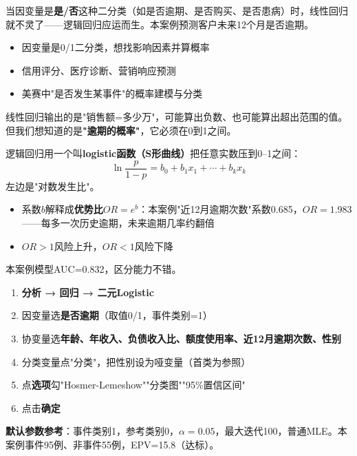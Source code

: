 
\begin{algointro}
当因变量是\textbf{是/否}这种二分类（如是否逾期、是否购买、是否患病）时，线性回归就不灵了——逻辑回归应运而生。本案例预测客户未来12个月是否逾期。
\end{algointro}

\begin{algoscene}
\begin{itemize}
    \item 因变量是0/1二分类，想找影响因素并算概率
    \item 信用评分、医疗诊断、营销响应预测
    \item 美赛中"是否发生某事件"的概率建模与分类
\end{itemize}
\end{algoscene}

\begin{algoprinciple}
线性回归输出的是"销售额=多少万"，可能算出负数、也可能算出超出范围的值。但我们想知道的是\textbf{"逾期的概率"}，它必须在0到1之间。

逻辑回归用一个叫\textbf{logistic函数（S形曲线）}把任意实数压到0--1之间：
$$\ln\frac{p}{1-p}=b_0+b_1x_1+\cdots+b_kx_k$$
左边是"对数发生比"。
\begin{itemize}
    \item 系数$b$解释成\textbf{优势比$OR=e^b$}：本案例"近12月逾期次数"系数0.685，$OR=1.983$——每多一次历史逾期，未来逾期几率约翻倍
    \item $OR>1$风险上升，$OR<1$风险下降
\end{itemize}

本案例模型AUC=0.832，区分能力不错。
\end{algoprinciple}

\begin{algosposs}
\begin{enumerate}
    \item \textbf{分析 → 回归 → 二元Logistic}
    \item 因变量选\textbf{是否逾期}（取值0/1，事件类别=1）
    \item 协变量选\textbf{年龄、年收入、负债收入比、额度使用率、近12月逾期次数、性别}
    \item 分类变量点"分类"，把性别设为哑变量（首类为参照）
    \item 点\textbf{选项}勾"Hosmer-Lemeshow""分类图""95\%置信区间"
    \item 点击\textbf{确定}
\end{enumerate}

\textbf{默认参数参考}：事件类别1，参考类别0，$\alpha=0.05$，最大迭代100，普通MLE。本案例事件95例、非事件55例，EPV=15.8（达标）。
\end{algosposs}

